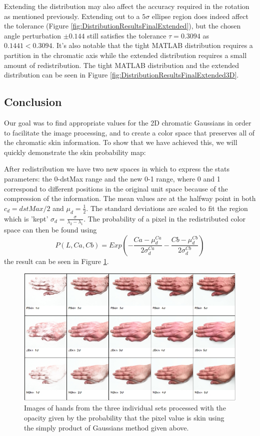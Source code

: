 Extending the distribution may also affect the accuracy required in the rotation as mentioned previously. Extending out to a $5\sigma$ ellipse region does indeed affect the tolerance (Figure \ref{fig:DistributionResultsFinalExtended}), but the chosen angle perturbation $\pm0.144$ still satisfies the tolerance $\tau = 0.3094$ as $0.1441 < 0.3094$. It's also notable that the tight MATLAB distribution requires a partition in the chromatic axis while the extended distribution requires a small amount of redistribution. The tight MATLAB distribution and the extended distribution can be seen in Figure \ref{fig:DistributionResultsFinalExtended3D}.

\subsection{Conclusion}

Our goal was to find appropriate values for the 2D chromatic Gaussians in order to facilitate the image processing, and to create a color space that preserves all of the chromatic skin information. To show that we have achieved this, we will quickly demonstrate the skin probability map:

After redistribution we have two new spaces in which to express the stats parameters: the 0-dstMax range and the new 0-1 range, where 0 and 1 correspond to different positions in the original unit space because of the compression of the information. The mean values are at the halfway point in both $c_d=dstMax/2$ and $\mu_d = \frac{1}{2}$.  The standard deviations are scaled to fit the region which is 'kept' $\sigma_d=\frac{\sigma}{\lambda_2-\lambda_1}$. The probability of a pixel in the redistributed color space can then be found using 
\begin{equation}
P(L,Ca,Cb) = Exp(- \frac{Ca-\mu_d^{Ca} }{2 \sigma_d^{Ca}} - \frac{Cb-\mu_d^{Cb} }{2 \sigma_d^{Cb}})
\end{equation}
the result can be seen in Figure \ref{fig:TransformImages}.
\begin{figure}[h!]
  \centering
  \includegraphics[width=0.95 \textwidth]{Chapter3/Figs/TransformImages.jpg} 
    \caption{ Images of hands from the three individual sets processed with the opacity given by the probability that the pixel value is skin using the simply product of Gaussians method given above.}  \label{fig:TransformImages}
\end{figure}


